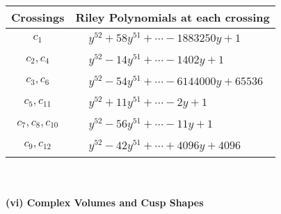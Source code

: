 \documentclass[1p]{elsarticle_modified}
\theoremstyle{definition}
\begin{document}
\begin{tabular}{m{50pt}|m{274pt}}
Crossings & \hspace{64pt}Riley Polynomials at each crossing \\
\hline $$\begin{aligned}c_{1}\end{aligned}$$&$\begin{aligned}
&y^{52}+58 y^{51}+\cdots-1883250 y+1
\end{aligned}$\\
\hline $$\begin{aligned}c_{2},c_{4}\end{aligned}$$&$\begin{aligned}
&y^{52}-14 y^{51}+\cdots-1402 y+1
\end{aligned}$\\
\hline $$\begin{aligned}c_{3},c_{6}\end{aligned}$$&$\begin{aligned}
&y^{52}-54 y^{51}+\cdots-6144000 y+65536
\end{aligned}$\\
\hline $$\begin{aligned}c_{5},c_{11}\end{aligned}$$&$\begin{aligned}
&y^{52}+11 y^{51}+\cdots-2 y+1
\end{aligned}$\\
\hline $$\begin{aligned}c_{7},c_{8},c_{10}\end{aligned}$$&$\begin{aligned}
&y^{52}-56 y^{51}+\cdots-11 y+1
\end{aligned}$\\
\hline $$\begin{aligned}c_{9},c_{12}\end{aligned}$$&$\begin{aligned}
&y^{52}-42 y^{51}+\cdots+4096 y+4096
\end{aligned}$\\
\hline
\end{tabular}\\~\\
\newpage\flushleft \textbf{(vi) Complex Volumes and Cusp Shapes}
\end{document}
